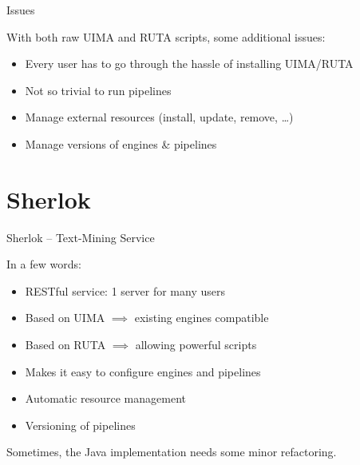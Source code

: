 \documentclass[10pt, compress, xcolor={usenames,dvipsnames}]{beamer}
\newcommand{\SmallArrow}{\ding{228}}
\newcommand{\hence}{\implies}
\renewcommand{\emph}[1]{\alert{#1}}
\newcommand{\light}{\color{TealBlue}}
\begin{document}
\begin{frame}[fragile]{Issues}

  With both raw UIMA and RUTA scripts, some additional issues:

  \vspace{1em}

  \begin{itemize}[label=\SmallArrow, itemsep=1em]

    \item Every user has to go through the hassle of installing UIMA/RUTA

    \item Not so trivial to run pipelines

    \item Manage \emph{external resources} (install, update, remove, \ldots)

    \item Manage versions of engines \& pipelines

  \end{itemize}

\end{frame}

\section{Sherlok}

\begin{frame}[fragile]{Sherlok -- Text-Mining Service}

  In a few words:

  \begin{itemize}[label=\SmallArrow, itemsep=1em]

    \item \emph{RESTful} service: 1 server for many users

    \item Based on UIMA $\hence$ existing engines compatible
      \only<2->{{\light(almost)}}

    \item Based on RUTA $\hence$ allowing powerful scripts

    \item Makes it easy to \emph{configure} engines and pipelines

    \item \emph{Automatic resource} management

    \item \emph{Versioning} of pipelines

  \end{itemize}

  \pause

  Sometimes, the Java implementation needs some {\light minor} refactoring.

\end{frame}
\end{document}
